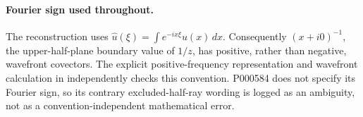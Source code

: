 \paragraph{Fourier sign used throughout.}
The reconstruction uses
\(\widehat u(\xi)=\int e^{-ix\xi}u(x)\,dx\).
Consequently \((x+i0)^{-1}\), the upper-half-plane boundary value of
\(1/z\), has positive, rather than negative, wavefront covectors.
The explicit positive-frequency representation and wavefront
calculation in
\citet[Appendix A, equation (A.4)]{bohrlefeuvrepaternain2024invariant}
independently checks this convention. P000584 does not specify its
Fourier sign, so its contrary excluded-half-ray wording is logged as
an ambiguity, not as a convention-independent mathematical error.
